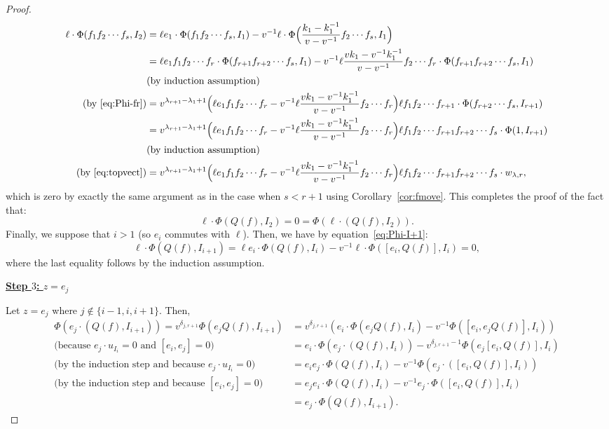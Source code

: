 \documentclass[10pt,a4paper]{amsart}
\begin{document}
\begin{proof}
\begin{align*}
\ell\cdot\Phi(f_1f_2\cdots f_s,I_{2})&=\ell e_1\cdot \Phi(f_1f_2\cdots f_s, I_1)-v^{-1}\ell\cdot\Phi\Big(\frac{k_1-k_1^{-1}}{v-v^{-1}}f_2\cdots f_s, I_{1}\Big)\\
&=\ell e_1f_1f_2\cdots f_r\cdot \Phi(f_{r+1}f_{r+2}\cdots f_s, I_1)-v^{-1}\ell\frac{vk_1-v^{-1}k_1^{-1}}{v-v^{-1}}f_2\cdots f_r\cdot \Phi(f_{r+1}f_{r+2}\cdots f_s, I_{1})\\
&\text{(by induction assumption)}\\
\text{(by~\eqref{eq:Phi-fr})}&=v^{\lambda_{r+1}-\lambda_1+1}\Big(\ell e_1f_1f_2\cdots f_r-v^{-1}\ell\frac{vk_1-v^{-1}k_1^{-1}}{v-v^{-1}}f_2\cdots f_r\Big)\ell f_1f_2\cdots f_{r+1} \cdot\Phi(f_{r+2}\cdots f_s, I_{r+1})\\
&=v^{\lambda_{r+1}-\lambda_1+1}\Big(\ell e_1f_1f_2\cdots f_r-v^{-1}\ell\frac{vk_1-v^{-1}k_1^{-1}}{v-v^{-1}}f_2\cdots f_r\Big)\ell f_1f_2\cdots f_{r+1}f_{r+2}\cdots f_s \cdot\Phi(1, I_{r+1})\\
&\text{(by induction assumption)}\\
\text{(by~\eqref{eq:topvect})}&=v^{\lambda_{r+1}-\lambda_1+1}\Big(\ell e_1f_1f_2\cdots f_r-v^{-1}\ell\frac{vk_1-v^{-1}k_1^{-1}}{v-v^{-1}}f_2\cdots f_r\Big)\ell f_1f_2\cdots f_{r+1}f_{r+2}\cdots f_s \cdot w_{\lambda, r},
\end{align*}
which is zero by exactly the same argument as in the case when $s<r+1$ using Corollary~\ref{cor:fmove}. This completes the proof of the fact that:
\begin{equation} \label{eq:ell20}\ell\cdot \Phi(Q(f), I_2) = 0 = \Phi(\ell\cdot (Q(f), I_2)).\end{equation}
Finally, we suppose that $i>1$ (so $e_i$ commutes with $\ell$). Then, we have by equation~\eqref{eq:Phi-I+1}:
\[\ell \cdot \Phi(Q(f),I_{i+1})=\ell e_i\cdot \Phi( Q(f), I_i)-v^{-1}\ell\cdot \Phi([e_i,Q(f)], I_{i})=0,\]
where the last equality follows by the induction assumption.

\underline{\textbf{Step $3$: $z=e_j$}}

Let $z=e_j$ where $j\not\in\{i-1,i,i+1\}$. Then, 
\begin{align*}\Phi( e_j\cdot(Q(f),I_{i+1}))=v^{\delta_{j,r+1}}\Phi( e_jQ(f),I_{i+1})&=v^{\delta_{j,r+1}}(e_i\cdot \Phi( e_jQ(f), I_i)-v^{-1}\Phi([e_i,e_jQ(f)], I_{i}))\\
\text{(because $e_j\cdot u_{I_i}=0$ and $[e_i,e_j]=0$) }&=e_i\cdot \Phi(e_j\cdot(Q(f), I_i))-v^{\delta_{j,r+1}-1}\Phi(e_j[e_i,Q(f)], I_{i})\\
\text{(by the induction step and because $e_j\cdot u_{I_i}=0$) }&=e_ie_j\cdot \Phi(Q(f), I_i)-v^{-1}\Phi(e_j\cdot([e_i,Q(f)], I_{i}))\\
\text{(by the induction step and because $[e_i,e_j]=0$) }&=e_je_i\cdot \Phi(Q(f), I_i)-v^{-1}e_j\cdot\Phi([e_i,Q(f)], I_{i}) \\
&=  e_j\cdot\Phi(Q(f),I_{i+1}).\end{align*}


\end{proof}
\end{document}
